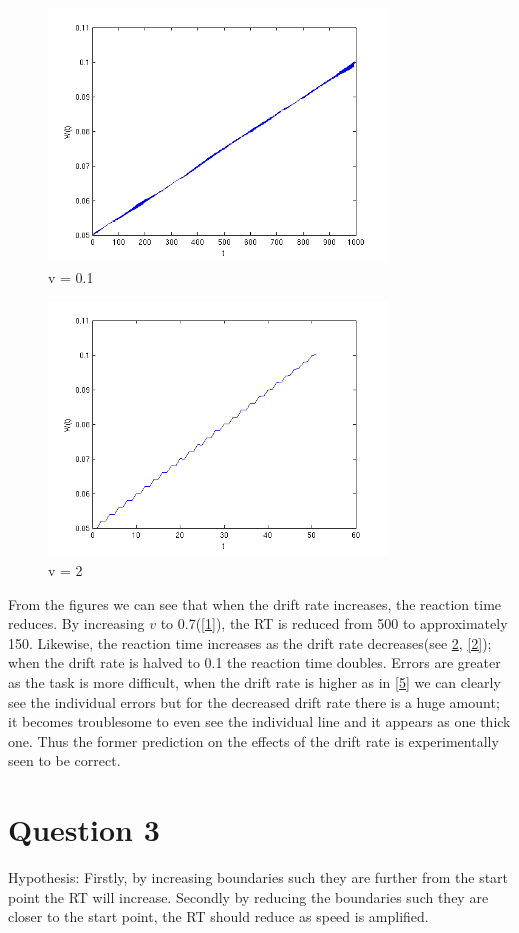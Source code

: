 \documentclass[11pt, twocolumn]{report}
\begin{document}
\begin{figure}
\centering
\includegraphics[width=90mm]{assignment2_images/p2/4.png}
\caption{v = 0.1}
\label{4}
\end{figure}

\begin{figure}
\centering
\includegraphics[width=90mm]{assignment2_images/p2/5.png}
\caption{v = 2}
\label{4}
\end{figure}


From the figures we can see that when the drift rate increases, the reaction time reduces. By increasing $v$ to 0.7(\ref{1}), the RT is reduced from 500 to approximately 150. Likewise, the reaction time increases as the drift rate decreases(see \ref{4}, \ref{2}); when the drift rate is halved to 0.1 the reaction time doubles. Errors are greater as the task is more difficult, when the drift rate is higher as in \ref{5} we can clearly see the individual errors but for the decreased drift rate there is a huge amount; it becomes troublesome to even see the individual line and it appears as one thick one. Thus the former prediction on the effects of the drift rate is experimentally seen to be correct. 

\section{Question 3}
Hypothesis: Firstly, by increasing boundaries such they are further from the start point the RT will increase. Secondly by reducing the boundaries such they are closer to the start point, the RT should reduce as speed is amplified. 
\end{document}
